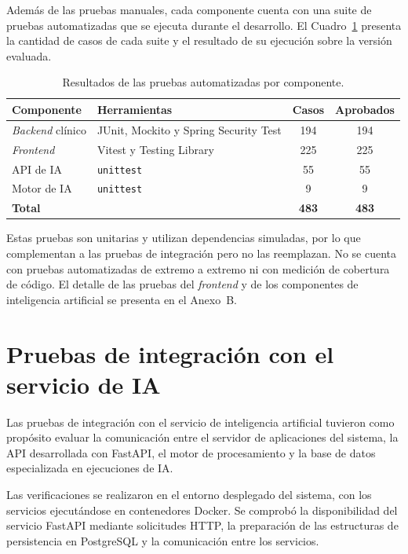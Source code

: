\begin{nuevotexto}
Además de las pruebas manuales, cada componente cuenta con una suite de pruebas automatizadas que se ejecuta durante el desarrollo.
El Cuadro~\ref{tab:pruebas-automatizadas} presenta la cantidad de casos de cada suite y el resultado de su ejecución sobre la versión evaluada.

\begin{table}[H]
\centering
\marcanuevo
\caption{Resultados de las pruebas automatizadas por componente.}
\label{tab:pruebas-automatizadas}
\small
\begin{tabular}{|p{3.4cm}|p{6.2cm}|c|c|}
\hline
\textbf{Componente} & \textbf{Herramientas} & \textbf{Casos} & \textbf{Aprobados} \\
\hline
\textit{Backend} clínico & JUnit, Mockito y Spring Security Test & 194 & 194 \\
\hline
\textit{Frontend} & Vitest y Testing Library & 225 & 225 \\
\hline
API de IA & \texttt{unittest} & 55 & 55 \\
\hline
Motor de IA & \texttt{unittest} & 9 & 9 \\
\hline
\textbf{Total} & & \textbf{483} & \textbf{483} \\
\hline
\end{tabular}
\end{table}

Estas pruebas son unitarias y utilizan dependencias simuladas, por lo que complementan a las pruebas de integración pero no las reemplazan.
No se cuenta con pruebas automatizadas de extremo a extremo ni con medición de cobertura de código.
El detalle de las pruebas del \textit{frontend} y de los componentes de inteligencia artificial se presenta en el Anexo~B.
\end{nuevotexto}

\section{Pruebas de integración con el servicio de IA}

Las pruebas de integración con el servicio de
inteligencia artificial tuvieron como propósito
evaluar la comunicación entre el servidor de
aplicaciones del sistema, la API desarrollada
con FastAPI, el motor de procesamiento y la
base de datos especializada en ejecuciones de IA.

Las verificaciones se realizaron en el entorno desplegado del sistema, con los servicios ejecutándose en contenedores Docker.
Se comprobó la disponibilidad del servicio FastAPI mediante solicitudes HTTP, la preparación de las estructuras de persistencia en PostgreSQL y la comunicación entre los servicios.

